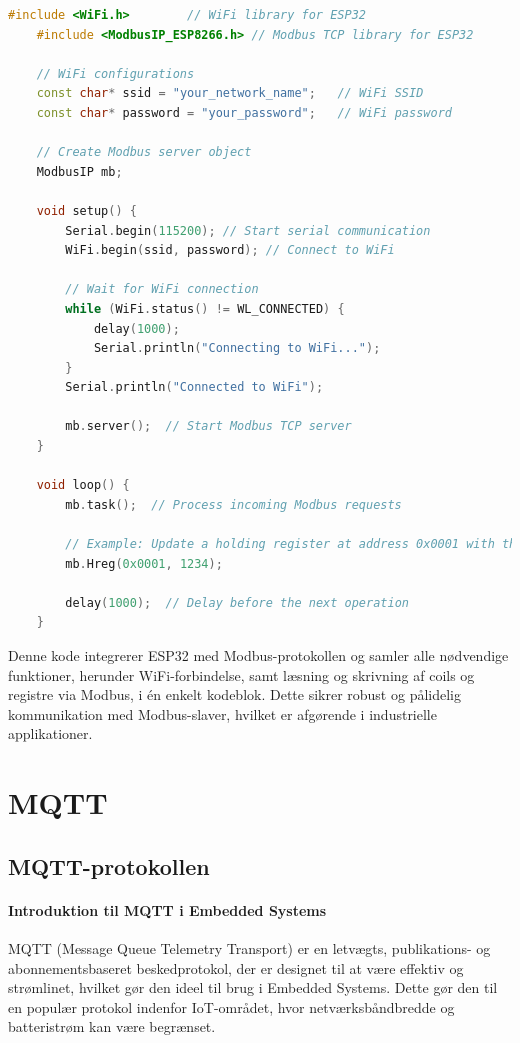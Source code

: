 \begin{lstlisting}[language=C++, caption=Integration af ESP32 med Modbus]
	#include <WiFi.h>        // WiFi library for ESP32
	#include <ModbusIP_ESP8266.h> // Modbus TCP library for ESP32
	
	// WiFi configurations
	const char* ssid = "your_network_name";   // WiFi SSID
	const char* password = "your_password";   // WiFi password
	
	// Create Modbus server object
	ModbusIP mb;
	
	void setup() {
		Serial.begin(115200); // Start serial communication
		WiFi.begin(ssid, password); // Connect to WiFi
		
		// Wait for WiFi connection
		while (WiFi.status() != WL_CONNECTED) {
			delay(1000); 
			Serial.println("Connecting to WiFi...");
		}
		Serial.println("Connected to WiFi");
		
		mb.server();  // Start Modbus TCP server
	}
	
	void loop() {
		mb.task();  // Process incoming Modbus requests
		
		// Example: Update a holding register at address 0x0001 with the value 1234
		mb.Hreg(0x0001, 1234);
		
		delay(1000);  // Delay before the next operation
	}
\end{lstlisting}
Denne kode integrerer ESP32 med Modbus-protokollen og samler alle nødvendige funktioner, herunder WiFi-forbindelse, samt læsning og skrivning af coils og registre via Modbus, i én enkelt kodeblok. Dette sikrer robust og pålidelig kommunikation med Modbus-slaver, hvilket er afgørende i industrielle applikationer.	

\chapter{MQTT}
\section{MQTT-protokollen}
\subsubsection*{Introduktion til MQTT i Embedded Systems}
MQTT (Message Queue Telemetry Transport) er en letvægts, publikations- og abonnementsbaseret beskedprotokol, der er designet til at være effektiv og strømlinet, hvilket gør den ideel til brug i Embedded Systems. Dette gør den til en populær protokol indenfor IoT-området, hvor netværksbåndbredde og batteristrøm kan være begrænset.

